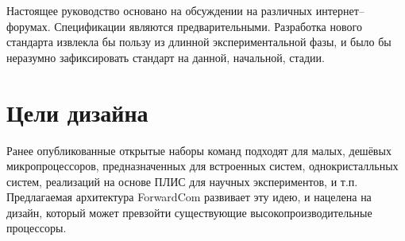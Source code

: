 \documentclass[forwardcom.tex]{subfiles}
\begin{document}
Настоящее руководство основано на обсуждении на различных интернет--форумах. Спецификации являются предварительными. Разработка нового стандарта извлекла бы пользу из длинной экспериментальной фазы, и было бы неразумно зафиксировать стандарт на данной, начальной, стадии.

\section{Цели дизайна}
Ранее опубликованные открытые наборы команд подходят для малых, дешёвых микропроцессоров, предназначенных для встроенных систем, однокристалльных систем,
реализаций на основе ПЛИС для научных экспериментов, и т.п. Предлагаемая архитектура ForwardCom развивает эту идею, и нацелена на дизайн, который может
превзойти существующие высокопроизводительные процессоры.
\end{document}
